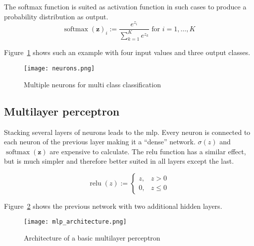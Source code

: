 The softmax function is suited as activation function in such cases to produce a probability distribution as output.
\begin{equation}
    \operatorname{softmax}(\mathbf{z})_{i} := {\frac{e^{z_{i}}}{\sum_{k=1}^{K}e^{z_{k}}}}\text{ for }i=1,\dotsc ,K
\end{equation}

Figure~\ref{fig:neurons} shows such an example with four input values and three output classes.

\begin{figure}[H]
    \begin{center}
    \texttt{[image: neurons.png]}
    \caption{Multiple neurons for multi class classification}\label{fig:neurons}
    \end{center}
\end{figure}

\subsection{Multilayer perceptron}
Stacking several layers of neurons leads to the \gls{mlp}. Every neuron is connected to each neuron of the previous layer making it a ``dense'' network.
$\sigma(z)$ and $\operatorname{softmax}(\mathbf{z})$ are expensive to calculate. The \gls{relu} function has a similar effect, but is much simpler and therefore better suited in all layers except the last.

\begin{equation}
\operatorname{relu}(z) := \begin{cases}z,&z>0\\0,&z\leq 0\end{cases}
\end{equation}

Figure~\ref{fig:mlp_architecture} shows the previous network with two additional hidden layers.

\begin{figure}[H]
    \begin{center}
    \texttt{[image: mlp\_architecture.png]}
    \caption{Architecture of a basic multilayer perceptron}\label{fig:mlp_architecture}
    \end{center}
\end{figure}


